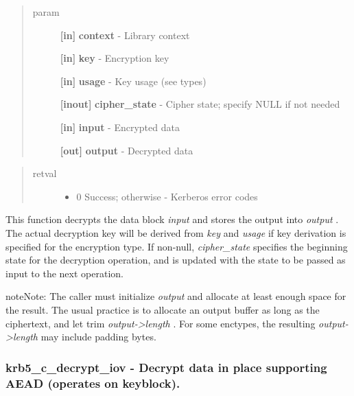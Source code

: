 \documentclass[letterpaper,10pt,english]{sphinxmanual}
\begin{document}
\begin{quote}\begin{description}
\item[{param}] \leavevmode
\textbf{{[}in{]}} \textbf{context} - Library context

\textbf{{[}in{]}} \textbf{key} - Encryption key

\textbf{{[}in{]}} \textbf{usage} - Key usage (see  types)

\textbf{{[}inout{]}} \textbf{cipher\_state} - Cipher state; specify NULL if not needed

\textbf{{[}in{]}} \textbf{input} - Encrypted data

\textbf{{[}out{]}} \textbf{output} - Decrypted data

\end{description}\end{quote}
\begin{quote}\begin{description}
\item[{retval}] \leavevmode\begin{itemize}
\item {} 
0   Success; otherwise - Kerberos error codes

\end{itemize}

\end{description}\end{quote}

This function decrypts the data block \emph{input} and stores the output into \emph{output} . The actual decryption key will be derived from \emph{key} and \emph{usage} if key derivation is specified for the encryption type. If non-null, \emph{cipher\_state} specifies the beginning state for the decryption operation, and is updated with the state to be passed as input to the next operation.

\begin{notice}{note}{Note:}
The caller must initialize \emph{output} and allocate at least enough space for the result. The usual practice is to allocate an output buffer as long as the ciphertext, and let {\hyperref[appdev/refs/api/krb5_c_decrypt:krb5_c_decrypt]{}} trim \emph{output-\textgreater{}length} . For some enctypes, the resulting \emph{output-\textgreater{}length} may include padding bytes.
\end{notice}


\subsubsection{krb5\_c\_decrypt\_iov -  Decrypt data in place supporting AEAD (operates on keyblock).}
\label{appdev/refs/api/krb5_c_decrypt_iov:krb5-c-decrypt-iov-decrypt-data-in-place-supporting-aead-operates-on-keyblock}\label{appdev/refs/api/krb5_c_decrypt_iov::doc}
\end{document}

